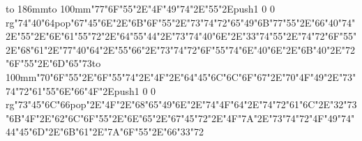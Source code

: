 \hbox to 186mm{\hsize=81mm\vbox to 100mm{\vfill\ipa\char"77\ipa\char"6F\ipa\char"55\ipa\char"2E\ipa\char"4F\ipa\char"49\ipa\char"74\ipa\char"2E\ipa\char"55\ipa\char"2E\pdfcolorstack\match push{1 0 0 rg}\ipa\char"74\ipa\char"40\ipa\char"64\pdfcolorstack\match pop{}\medskip\ipa\char"67\ipa\char"45\ipa\char"6E\ipa\char"2E\ipa\char"6B\ipa\char"6F\ipa\char"55\ipa\char"2E\ipa\char"73\ipa\char"74\ipa\char"72\ipa\char"65\ipa\char"49\ipa\char"6B\medskip\ipa\char"77\ipa\char"55\ipa\char"2E\ipa\char"66\ipa\char"40\ipa\char"74\ipa\char"2E\ipa\char"55\ipa\char"2E\ipa\char"6E\ipa\char"61\ipa\char"55\ipa\char"72\ipa\char"2E\ipa\char"64\ipa\char"55\ipa\char"44\ipa\char"2E\ipa\char"73\ipa\char"74\ipa\char"40\ipa\char"6E\ipa\char"2E\ipa\char"33\ipa\char"74\medskip\ipa\char"55\ipa\char"2E\ipa\char"74\ipa\char"72\ipa\char"6F\ipa\char"55\ipa\char"2E\ipa\char"68\ipa\char"61\ipa\char"2E\ipa\char"77\ipa\char"40\ipa\char"64\ipa\char"2E\ipa\char"55\ipa\char"66\ipa\char"2E\ipa\char"73\ipa\char"74\ipa\char"72\ipa\char"6F\ipa\char"55\ipa\char"74\medskip\ipa\char"6E\ipa\char"40\ipa\char"6E\ipa\char"2E\ipa\char"6B\ipa\char"40\ipa\char"2E\ipa\char"72\ipa\char"6F\ipa\char"55\ipa\char"2E\ipa\char"6D\ipa\char"65\ipa\char"73\vfill}\hfill\vbox to 100mm{\vfill\ipa\char"70\ipa\char"6F\ipa\char"55\ipa\char"2E\ipa\char"6F\ipa\char"55\ipa\char"74\ipa\char"2E\ipa\char"4F\ipa\char"2E\ipa\char"64\ipa\char"45\ipa\char"6C\medskip\ipa\char"6C\ipa\char"6F\ipa\char"67\ipa\char"2E\ipa\char"70\ipa\char"4F\ipa\char"49\ipa\char"2E\ipa\char"73\ipa\char"74\ipa\char"72\ipa\char"61\ipa\char"55\ipa\char"6E\medskip\ipa\char"66\ipa\char"4F\ipa\char"2E\pdfcolorstack\match push{1 0 0 rg}\ipa\char"73\ipa\char"45\ipa\char"6C\ipa\char"66\pdfcolorstack\match pop{}\ipa\char"2E\ipa\char"4F\ipa\char"2E\ipa\char"68\ipa\char"65\ipa\char"49\ipa\char"6E\ipa\char"2E\ipa\char"74\ipa\char"4F\ipa\char"64\ipa\char"2E\ipa\char"74\ipa\char"72\ipa\char"61\ipa\char"6C\ipa\char"2E\ipa\char"32\ipa\char"73\ipa\char"6B\medskip\ipa\char"4F\ipa\char"2E\ipa\char"62\ipa\char"6C\ipa\char"6F\ipa\char"55\ipa\char"2E\ipa\char"6E\ipa\char"65\ipa\char"2E\ipa\char"67\ipa\char"45\ipa\char"72\ipa\char"2E\ipa\char"4F\ipa\char"7A\ipa\char"2E\ipa\char"73\ipa\char"74\ipa\char"72\ipa\char"4F\ipa\char"49\ipa\char"74\medskip\ipa\char"44\ipa\char"45\ipa\char"6D\ipa\char"2E\ipa\char"6B\ipa\char"61\ipa\char"2E\ipa\char"7A\ipa\char"6F\ipa\char"55\ipa\char"2E\ipa\char"66\ipa\char"33\ipa\char"72\vfill}}\eject
